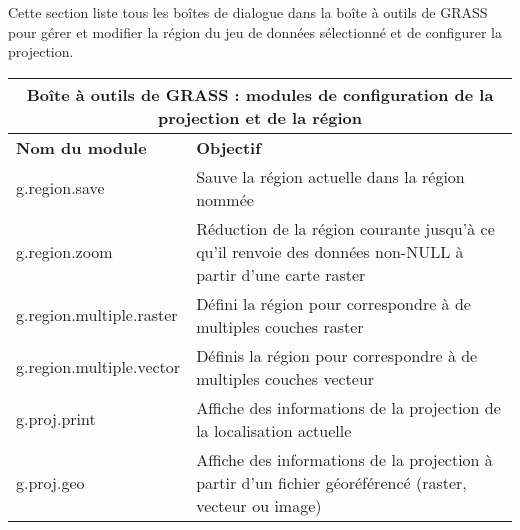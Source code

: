 Cette section liste tous les boîtes de dialogue dans la boîte à outils de GRASS pour gérer et modifier la région du jeu de données sélectionné et de configurer la projection.

\begin{table}[H]
\centering
 \begin{tabular}{|p{4cm}|p{10cm}|}
  \hline \multicolumn{2}{|c|}{\textbf{Boîte à outils de GRASS : modules de configuration de la projection et de la région}} \\
  \hline \textbf{Nom du module} & \textbf{Objectif} \\
\hline g.region.save & Sauve la région actuelle dans la région nommée \\
  \hline g.region.zoom & Réduction de la région courante jusqu'à ce qu'il renvoie des données non-NULL à partir d'une carte raster \\
  \hline g.region.multiple.raster & Défini la région pour correspondre à de multiples couches raster \\
  \hline g.region.multiple.vector & Définis la région pour correspondre à de multiples couches vecteur \\
  \hline g.proj.print & Affiche des informations de la projection de la localisation actuelle \\
  \hline g.proj.geo & Affiche des informations de la projection à partir d'un fichier géoréférencé (raster, vecteur ou image)\\

\end{tabular}
\end{table}
